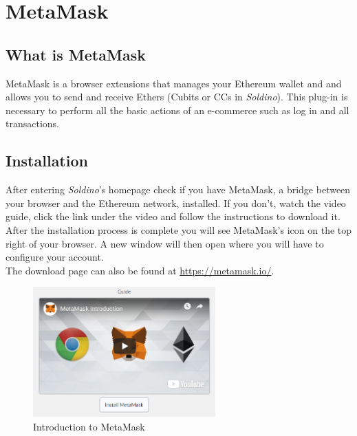\section{MetaMask}
	\subsection{What is MetaMask}
	MetaMask is a browser extensions that manages your Ethereum wallet and 
	and allows you to send and receive Ethers (Cubits or CCs in \textit{Soldino}). 
	This plug-in is necessary to perform all the basic actions of an 
	e-commerce such as log in and all transactions. 
	\subsection{Installation}
	After entering \textit{Soldino}'s homepage check if you have MetaMask, a 
	bridge between your browser and the Ethereum network, installed.
	If you don't, watch the video guide, click the link under the video and 
	follow the instructions to download it. After the installation process is 
	complete you will see MetaMask's icon on the top right of your browser. A 
	new window will then open where you will have to configure your account.\\
	The download page can also be found at \url{https://metamask.io/}.
	\newline
	\begin{figure}[H]
		\includegraphics[width=7cm]{res/images/MetaMask_download.png}
		\centering
		\caption{Introduction to MetaMask}
	\end{figure}

